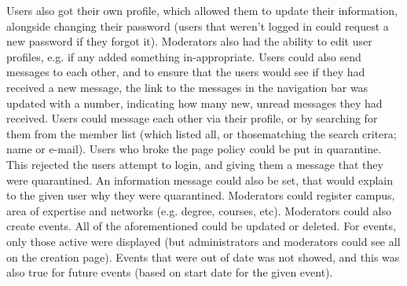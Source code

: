 Users also got their own profile, which allowed them to update their information, alongside changing their password 
(users that weren't logged in could request a new password if they forgot it). 
Moderators also had the ability to edit user profiles, e.g. if any added something in-appropriate.
\vspace{0.5em}\newline
Users could also send messages to each other, and to ensure that the users would see if they had received a new message, the link to the messages in the navigation 
bar was updated with a number, indicating how many new, unread messages they had received. 
Users could message each other via their profile, or by searching for them from the member list (which listed all, or thosematching the search critera; name or e-mail). 
Users who broke the page policy could be put in quarantine. 
This rejected the users attempt to login, and giving them a message that they were quarantined. 
An information message could also be set, that would explain to the given user why they were quarantined.
\vspace{0.5em}\newline
Moderators could register campus, area of expertise and networks (e.g. degree, courses, etc).
Moderators could also create events. 
All of the aforementioned could be updated or deleted. 
For events, only those active were displayed (but administrators and moderators could see all on the creation page). 
Events that were out of date was not showed, and this was also true for future events (based on start date for the given event).

